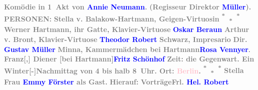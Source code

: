            \pstart
           \noindent{}\centering{}\textcolor{gray}{\textbf{Komödie in 1 Akt von \textcolor{blue}{Annie
                     Neumann}{}\ledrightnote{\textcolor{blue}{Annie Neumann-Hofer}}.}}\pend
           \pstart
           \noindent{}\centering{}\textcolor{gray}{\textbf{(Regisseur Direktor \textcolor{blue}{Müller}{}\ledrightnote{\textcolor{blue}{Gustav Müller}}).}}\pend
           \pstart
           \noindent{}\centering{}\textcolor{gray}{\textbf{PERSONEN:}}\pend
           \pstart
           \noindent{}\textcolor{gray}{\textbf{Stella v. Balakow-Hartmann, Geigen-Virtuosin }}\hfill \textcolor{gray}{\textbf{\textsuperscript{*} \textsubscript{*} \textsuperscript{*}}}\pend
           \pstart
           \textcolor{gray}{\textbf{Werner Hartmann, ihr Gatte, Klavier-Virtuose }}\hfill \textcolor{gray}{\textbf{\textcolor{blue}{Oskar Beraun}{}\ledrightnote{\textcolor{blue}{Oskar Beraun}}}}\pend
           \pstart
           \textcolor{gray}{\textbf{Arthur v. Bront, Klavier-Virtuose }}\hfill \textcolor{gray}{\textbf{\textcolor{blue}{Theodor Robert}{}\ledrightnote{\textcolor{blue}{Theodor Robert}}}}\pend
           \pstart
           \textcolor{gray}{\textbf{Schwarz, Impresario }}\hfill \textcolor{gray}{\textbf{Dir. \textcolor{blue}{Gustav Müller}{}\ledrightnote{\textcolor{blue}{Gustav Müller}}}}\pend
           \pstart
           \textcolor{gray}{\textbf{Minna, Kammermädchen bei Hartmann}}\hfill \textcolor{gray}{\textbf{\textcolor{blue}{Rosa Vennyer}{}\ledrightnote{\textcolor{blue}{Rosa Vennyer}}}}.\pend
           \pstart
           \textcolor{gray}{\textbf{Franz{[},{]} Diener {[}bei
                        Hartmann{]}}}\hfill \textcolor{gray}{\textbf{\textcolor{blue}{Fritz Schönhof}{}\ledrightnote{\textcolor{blue}{Friedrich Schönhof}}}}\pend
           \pstart
           \centering{}\textcolor{gray}{\textbf{Zeit: die Gegenwart. Ein Winter{[}-{]}Nachmittag
                  von 4 bis halb 8 Uhr. Ort: \textcolor{pink}{Berlin}{}\ledrightnote{\textcolor{pink}{Berlin}}.}}\pend
           \pstart
           \noindent{}\textcolor{gray}{\textbf{\textsuperscript{*} \textsubscript{*} \textsuperscript{*} Stella }}\hfill \textcolor{gray}{\textbf{Frau \textcolor{blue}{Emmy Förster}{}\ledrightnote{\textcolor{blue}{Emmy Förster}} als
                     Gast.}}\pend
           {\bigskip}\pstart
           \noindent{}\centering{}\textcolor{gray}{\textbf{Hierauf:}}\pend
           \pstart
           \noindent{}\textcolor{gray}{\textbf{Vorträge}}\hfill \textcolor{gray}{\textbf{Frl. \textcolor{blue}{Hel. Robert}{}\ledrightnote{\textcolor{blue}{Helene Robert}}}}\pend
